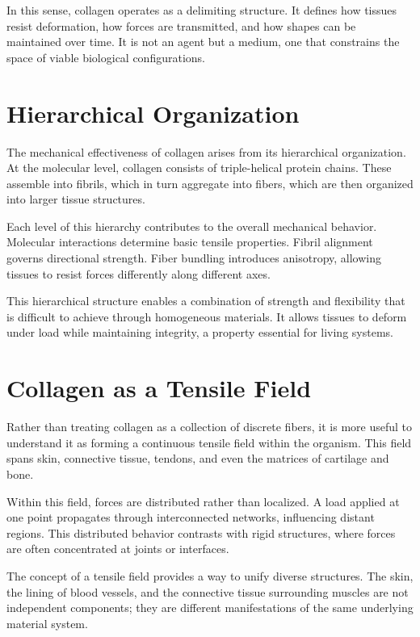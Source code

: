 \documentclass[11pt,oneside]{book}
\begin{document}
In this sense, collagen operates as a delimiting structure. It defines how tissues resist deformation, how forces are transmitted, and how shapes can be maintained over time. It is not an agent but a medium, one that constrains the space of viable biological configurations.

\section{Hierarchical Organization}

The mechanical effectiveness of collagen arises from its hierarchical organization. At the molecular level, collagen consists of triple-helical protein chains. These assemble into fibrils, which in turn aggregate into fibers, which are then organized into larger tissue structures.

Each level of this hierarchy contributes to the overall mechanical behavior. Molecular interactions determine basic tensile properties. Fibril alignment governs directional strength. Fiber bundling introduces anisotropy, allowing tissues to resist forces differently along different axes.

This hierarchical structure enables a combination of strength and flexibility that is difficult to achieve through homogeneous materials. It allows tissues to deform under load while maintaining integrity, a property essential for living systems.

\section{Collagen as a Tensile Field}

Rather than treating collagen as a collection of discrete fibers, it is more useful to understand it as forming a continuous tensile field within the organism. This field spans skin, connective tissue, tendons, and even the matrices of cartilage and bone.

Within this field, forces are distributed rather than localized. A load applied at one point propagates through interconnected networks, influencing distant regions. This distributed behavior contrasts with rigid structures, where forces are often concentrated at joints or interfaces.

The concept of a tensile field provides a way to unify diverse structures. The skin, the lining of blood vessels, and the connective tissue surrounding muscles are not independent components; they are different manifestations of the same underlying material system.
\end{document}
